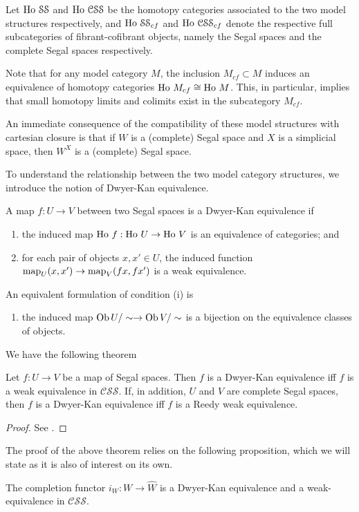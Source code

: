 \begin{refsection}
Let $\operatorname{\mathrm{Ho} \,}\mathcal{SS}$ and $\operatorname{\mathrm{Ho} \,}\mathcal{CSS}$ be the homotopy categories associated to the two model structures respectively, and $\operatorname{\mathrm{Ho} \,}\mathcal{SS}_{cf}$ and $\operatorname{\mathrm{Ho} \,}\mathcal{CSS}_{cf}$ denote the respective full subcategories of fibrant-cofibrant objects, namely the Segal spaces and the complete Segal spaces respectively.

Note that for any model category $M$, the inclusion $M_{cf}\subset M$ induces an equivalence of homotopy categories $\operatorname{\mathrm{Ho} \,} M_{cf}\cong\operatorname{\mathrm{Ho} \,} M$. This, in particular, implies that small homotopy limits and colimits exist in the subcategory $M_{cf}$.

An immediate consequence of the compatibility of these model structures with cartesian closure is that if $W$ is a (complete) Segal space and $X$ is a simplicial space, then $W^X$ is a (complete) Segal space.

To understand the relationship between the two model category structures, we introduce the notion of Dwyer-Kan equivalence.
\begin{defin}
A map $f:U\to V$ between two Segal spaces is a Dwyer-Kan equivalence if
\begin{enumerate}
\item the induced map $\operatorname{\mathrm{Ho} \,} f:\operatorname{\mathrm{Ho} \,} U\to\operatorname{\mathrm{Ho} \,} V$ is an equivalence of categories; and
\item for each pair of objects $x,x'\in U$, the induced function $\operatorname{\mathrm{map}}_U(x,x')\to\operatorname{\mathrm{map}}_V(fx,fx')$ is a weak equivalence.
\end{enumerate}
An equivalent formulation of condition (i) is
\begin{enumerate}
\item the induced map $\operatorname{Ob} U/\sim\to\operatorname{Ob} V/\sim$ is a bijection on the equivalence classes of objects.
\end{enumerate}
\end{defin}
We have the following theorem
\begin{thm}
Let $f:U\to V$ be a map of Segal spaces. Then $f$ is a Dwyer-Kan equivalence iff $f$ is a weak equivalence in $\mathcal{CSS}$. If, in addition, $U$ and $V$ are complete Segal spaces, then $f$ is a Dwyer-Kan equivalence iff $f$ is a Reedy weak equivalence.
\end{thm}
\begin{proof}
See \cite[Thm 7.7]{rezk}.
\end{proof}

The proof of the above theorem relies on the following proposition, which we will state as it is also of interest on its own.
\begin{prop}\label{iw}
The completion functor $i_W:W\to\hat W$ is a Dwyer-Kan equivalence and a weak-equivalence in $\mathcal{CSS}$.
\end{prop}


\end{refsection}
